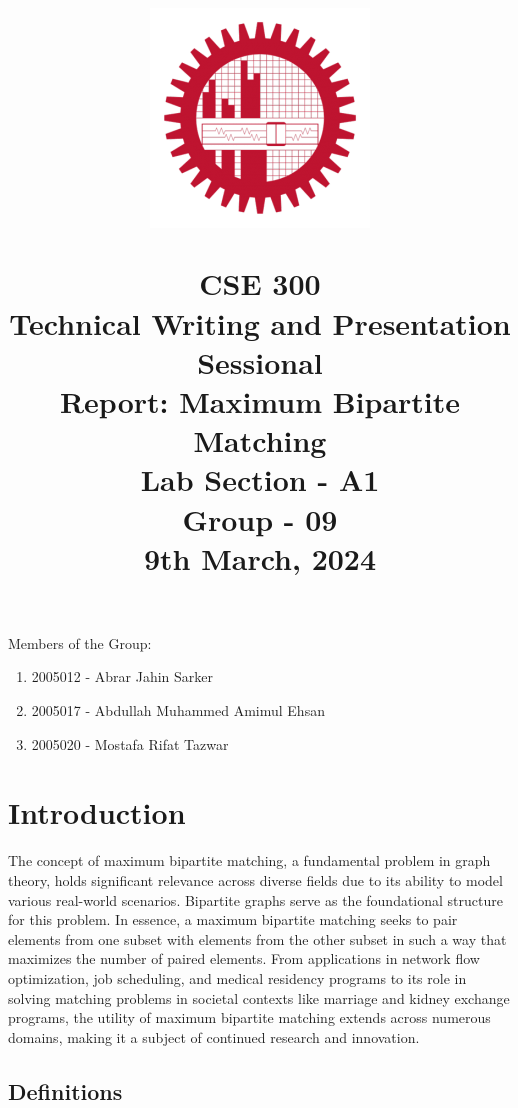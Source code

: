 \documentclass{article}
\title{
\begin{center}
\begin{figure}[!h]
    \centering
    \includegraphics[scale = 0.75]{Img/buetlogo.png}
\end{figure}
CSE 300\\
Technical Writing and Presentation Sessional\\
Report: Maximum Bipartite Matching\\
Lab Section - A1\\
Group - 09\\
9th March, 2024
\end{center}
}
\author{}
\date{}
\begin{document}
\maketitle

\raggedright
\Large{Members of the Group:\par}
\Large{
\begin{enumerate}[label = \roman*.]
    \item 2005012 - Abrar Jahin Sarker
    \item 2005017 - Abdullah  Muhammed  Amimul Ehsan
    \item 2005020 - Mostafa Rifat Tazwar
\end{enumerate}
}
\newpage
\tableofcontents
\newpage
\section{Introduction}
\Large
The concept of maximum bipartite matching, a fundamental problem in graph theory, holds significant relevance across diverse fields due to its ability to model various real-world scenarios. Bipartite graphs serve as the foundational structure for this problem. In essence, a maximum bipartite matching seeks to pair elements from one subset with elements from the other subset in such a way that maximizes the number of paired elements. From applications in network flow optimization, job scheduling, and medical residency programs to its role in solving matching problems in societal contexts like marriage and kidney exchange programs, the utility of maximum bipartite matching extends across numerous domains, making it a subject of continued research and innovation.  
\subsection{Definitions}
\end{document}
